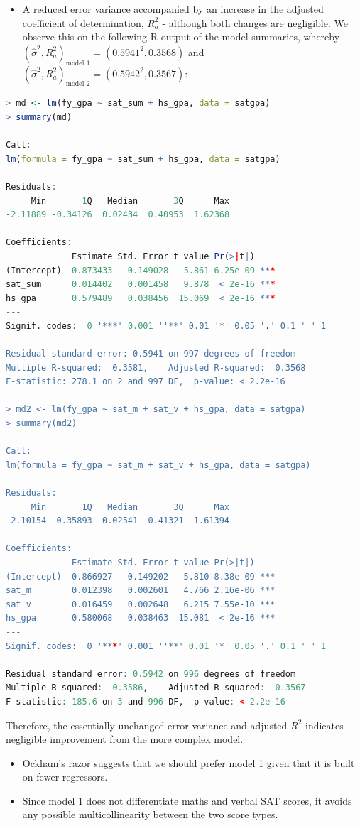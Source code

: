 \documentclass[]{article}
\begin{document}
\begin{itemize}
    \item A reduced error variance accompanied by an increase in the adjusted coefficient of determination, $R_a^2$ - although both changes are negligible. We observe this on the following \textsf{R} output of the model summaries, whereby $(\hat{\sigma}^2,{R}_a^2)_{\text{model }1} = (0.5941^2,0.3568)$ and $(\hat{\sigma}^2,{R}_a^2)_{\text{model }2} = (0.5942^2,0.3567)$:

\end{itemize}
\begin{lstlisting}[language=R]
> md <- lm(fy_gpa ~ sat_sum + hs_gpa, data = satgpa)
> summary(md)

Call:
lm(formula = fy_gpa ~ sat_sum + hs_gpa, data = satgpa)

Residuals:
     Min       1Q   Median       3Q      Max 
-2.11889 -0.34126  0.02434  0.40953  1.62368 

Coefficients:
             Estimate Std. Error t value Pr(>|t|)    
(Intercept) -0.873433   0.149028  -5.861 6.25e-09 ***
sat_sum      0.014402   0.001458   9.878  < 2e-16 ***
hs_gpa       0.579489   0.038456  15.069  < 2e-16 ***
---
Signif. codes:  0 '***' 0.001 ''**' 0.01 '*' 0.05 '.' 0.1 ' ' 1

Residual standard error: 0.5941 on 997 degrees of freedom
Multiple R-squared:  0.3581,	Adjusted R-squared:  0.3568 
F-statistic: 278.1 on 2 and 997 DF,  p-value: < 2.2e-16

> md2 <- lm(fy_gpa ~ sat_m + sat_v + hs_gpa, data = satgpa)
> summary(md2)

Call:
lm(formula = fy_gpa ~ sat_m + sat_v + hs_gpa, data = satgpa)

Residuals:
     Min       1Q   Median       3Q      Max 
-2.10154 -0.35893  0.02541  0.41321  1.61394 

Coefficients:
             Estimate Std. Error t value Pr(>|t|)    
(Intercept) -0.866927   0.149202  -5.810 8.38e-09 ***
sat_m        0.012398   0.002601   4.766 2.16e-06 ***
sat_v        0.016459   0.002648   6.215 7.55e-10 ***
hs_gpa       0.580068   0.038463  15.081  < 2e-16 ***
---
Signif. codes:  0 '***' 0.001 ''**' 0.01 '*' 0.05 '.' 0.1 ' ' 1

Residual standard error: 0.5942 on 996 degrees of freedom
Multiple R-squared:  0.3586,	Adjusted R-squared:  0.3567 
F-statistic: 185.6 on 3 and 996 DF,  p-value: < 2.2e-16     \end{lstlisting}
        Therefore, the essentially unchanged error variance and adjusted $R^2$ indicates negligible improvement from the more complex model.
    \begin{itemize}
  \item Ockham’s razor suggests that we should prefer model 1 given that it is built on fewer regressors. 
  \item Since model 1 does not differentiate maths and verbal SAT scores, it avoids any possible multicollinearity between the two score types.

\end{itemize}
\end{document}
